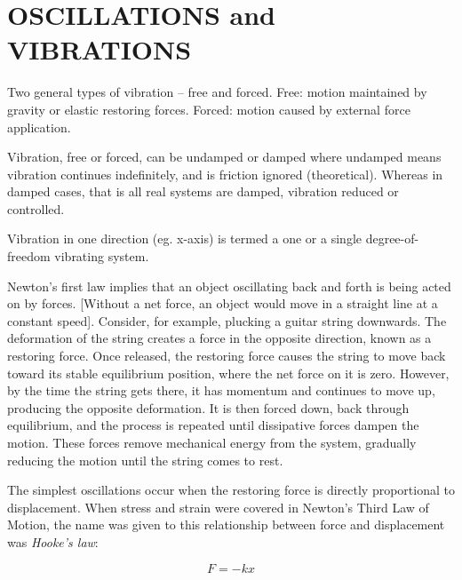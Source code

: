\documentclass[12pt, letterpaper, twoside]{article}
\begin{document}
\newpage


\section{OSCILLATIONS and VIBRATIONS}


Two general types of vibration – free and forced.
\linebreak
Free:		motion maintained by gravity or elastic restoring 					forces.\linebreak
Forced:	motion caused by external force application.\linebreak

Vibration, free or forced, can be undamped or damped where undamped means	vibration continues indefinitely, and is friction ignored (theoretical).  Whereas in damped cases, that is all real systems are damped, vibration reduced or controlled.
\linebreak

Vibration in one direction (eg. x-axis) is termed a one or a single degree-of-freedom vibrating system.
\linebreak

Newton’s first law implies that an object oscillating back and forth is being acted on by forces. [Without a net force, an object would move in a straight line at a constant speed]. Consider, for example, plucking a guitar string downwards. The deformation of the string creates a force in the opposite direction, known as a restoring force. Once released, the restoring force causes the string to move back toward its stable equilibrium position, where the net force on it is zero. However, by the time the string gets there, it has momentum and continues to move up, producing the opposite deformation. It is then forced down, back through equilibrium, and the process is repeated until dissipative forces dampen the motion. These forces remove mechanical energy from the system, gradually reducing the motion until the string comes to rest.\linebreak

The simplest oscillations occur when the restoring force is directly proportional to displacement. When stress and strain were covered in Newton’s Third Law of Motion, the name was given to this relationship between force and displacement was \emph{Hooke’s law}:
\linebreak

\begin{equation}
F=-kx
\end{equation}
\end{document}
